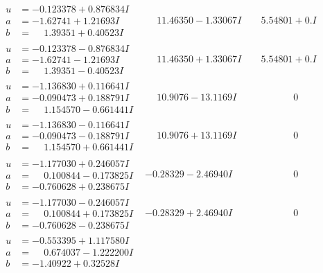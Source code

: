 \documentclass[1p]{elsarticle_modified}
\theoremstyle{definition}
\begin{document}
$$\begin{array}{c|c|c}
\begin{aligned}
u &= -0.123378 + 0.876834 I \\
a &= -1.62741 + 1.21693 I \\
b &= \phantom{-}1.39351 + 0.40523 I\end{aligned}
 & \phantom{-}11.46350 - 1.33067 I & \phantom{-}5.54801 + 0. I\phantom{ +0.000000I} \\ \hline\begin{aligned}
u &= -0.123378 - 0.876834 I \\
a &= -1.62741 - 1.21693 I \\
b &= \phantom{-}1.39351 - 0.40523 I\end{aligned}
 & \phantom{-}11.46350 + 1.33067 I & \phantom{-}5.54801 + 0. I\phantom{ +0.000000I} \\ \hline\begin{aligned}
u &= -1.136830 + 0.116641 I \\
a &= -0.090473 + 0.188791 I \\
b &= \phantom{-}1.154570 - 0.661441 I\end{aligned}
 & \phantom{-}10.9076 - 13.1169 I & \phantom{-0.000000 } 0 \\ \hline\begin{aligned}
u &= -1.136830 - 0.116641 I \\
a &= -0.090473 - 0.188791 I \\
b &= \phantom{-}1.154570 + 0.661441 I\end{aligned}
 & \phantom{-}10.9076 + 13.1169 I & \phantom{-0.000000 } 0 \\ \hline\begin{aligned}
u &= -1.177030 + 0.246057 I \\
a &= \phantom{-}0.100844 - 0.173825 I \\
b &= -0.760628 + 0.238675 I\end{aligned}
 & -0.28329 - 2.46940 I & \phantom{-0.000000 } 0 \\ \hline\begin{aligned}
u &= -1.177030 - 0.246057 I \\
a &= \phantom{-}0.100844 + 0.173825 I \\
b &= -0.760628 - 0.238675 I\end{aligned}
 & -0.28329 + 2.46940 I & \phantom{-0.000000 } 0 \\ \hline\begin{aligned}
u &= -0.553395 + 1.117580 I \\
a &= \phantom{-}0.674037 - 1.222200 I \\
b &= -1.40922 + 0.32528 I\end{aligned}

\end{array}$$
\end{document}
